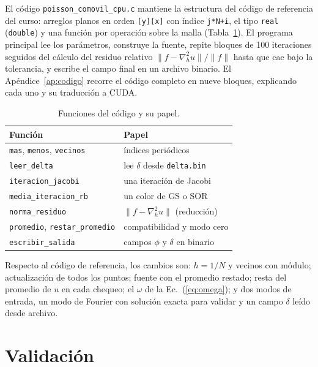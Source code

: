 \documentclass{aa}
\begin{document}
El código \texttt{poisson\_comovil\_cpu.c} mantiene la estructura del código de referencia del curso: arreglos planos en orden \texttt{[y][x]} con índice \texttt{j*N+i}, el tipo \texttt{real} (\texttt{double}) y una función por operación sobre la malla (Tabla~\ref{tab:funciones}). El programa principal lee los parámetros, construye la fuente, repite bloques de 100 iteraciones seguidos del cálculo del residuo relativo $\|f-\nabla_h^2u\|/\|f\|$ hasta que cae bajo la tolerancia, y escribe el campo final en un archivo binario. El Apéndice~\ref{ap:codigo} recorre el código completo en nueve bloques, explicando cada uno y su traducción a CUDA.

\begin{table}
  \caption{Funciones del código y su papel.}
  \label{tab:funciones}
  \centering
  \small
  \begin{tabular}{@{}ll@{}}
    \toprule
    Función & Papel \\
    \midrule
    \texttt{mas}, \texttt{menos}, \texttt{vecinos} & índices periódicos \\
    \texttt{leer\_delta} & lee $\delta$ desde \texttt{delta.bin} \\
    \texttt{iteracion\_jacobi} & una iteración de Jacobi \\
    \texttt{media\_iteracion\_rb} & un color de GS o SOR \\
    \texttt{norma\_residuo} & $\|f-\nabla_h^2u\|$ (reducción) \\
    \texttt{promedio}, \texttt{restar\_promedio} & compatibilidad y modo cero \\
    \texttt{escribir\_salida} & campos $\phi$ y $\delta$ en binario \\
    \bottomrule
  \end{tabular}
\end{table}

Respecto al código de referencia, los cambios son: $h=1/N$ y vecinos con módulo; actualización de todos los puntos; fuente con el promedio restado; resta del promedio de $u$ en cada chequeo; el $\omega$ de la Ec.~(\ref{eq:omega}); y dos modos de entrada, un modo de Fourier con solución exacta para validar y un campo $\delta$ leído desde archivo.

\section{Validación}
\end{document}

